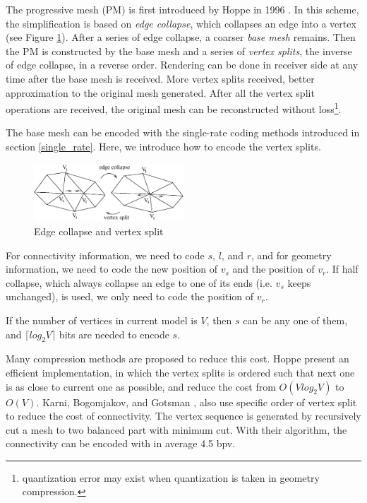 \documentclass[11pt, a4paper]{report}
\begin{document}
    The progressive mesh (PM) \label{progressive_mesh}is first
    introduced by Hoppe in 1996 \cite{hoppe96progressive}. In this
    scheme, the simplification is based on \emph{edge collapse}, which
    collapses an edge into a vertex (see Figure \ref{split2}).
    After a series of edge collapse, a coarser \emph{base mesh} remains. 
    Then the PM is constructed by the base mesh and a series of \emph{vertex
    splits}, the inverse of edge collapse, in a reverse order.
    Rendering can be done in receiver side at any time after the base
    mesh is received. More vertex splits received, better
    approximation to the original mesh generated. After all
    the vertex split operations are received, the original mesh can be
    reconstructed without loss\footnote{quantization error may exist
    when quantization is taken in geometry compression.}.

    The base mesh can be encoded with the single-rate coding methods
    introduced in section \ref{single_rate}. Here, we introduce
    how to encode the vertex splits. 
\begin{figure}
\centering
\includegraphics[width=0.5\textwidth]{split2.eps}
\caption{Edge collapse and vertex split}\label{split2}
\end{figure}
    For connectivity
    information, we need to code $s$, $l$, and $r$, and for geometry
    information, we need to code the new position of $v_{s}$ and the
    position of $v_{r}$. If half collapse, which always collapse an
    edge to one of its ends (i.e. $v_{s}$ keeps unchanged), is used, 
    we only need to code the position of $v_r$. 
    
    If the number of vertices in current model is
    $V$, then $s$ can be any one of them, 
    and ${\lceil}log_{2}V{\rceil}$ bits are needed to encode $s$. 
    
    Many compression methods are proposed to reduce this cost.
    Hoppe \cite{efficient:hoppe} present an efficient implementation,
    in which the vertex splits is ordered such that next one
    is as close to current one as possible, and reduce the cost
    from $O(Vlog_{2}V)$ to $O(V)$.
    Karni, Bogomjakov, and Gotsman \cite{602153}, 
    also use specific order of vertex split to reduce the cost of connectivity. 
    The vertex sequence is generated by recursively cut a mesh to two
    balanced part with minimum cut. With their algorithm, the connectivity can
    be encoded with in average 4.5 bpv. 
\end{document}
